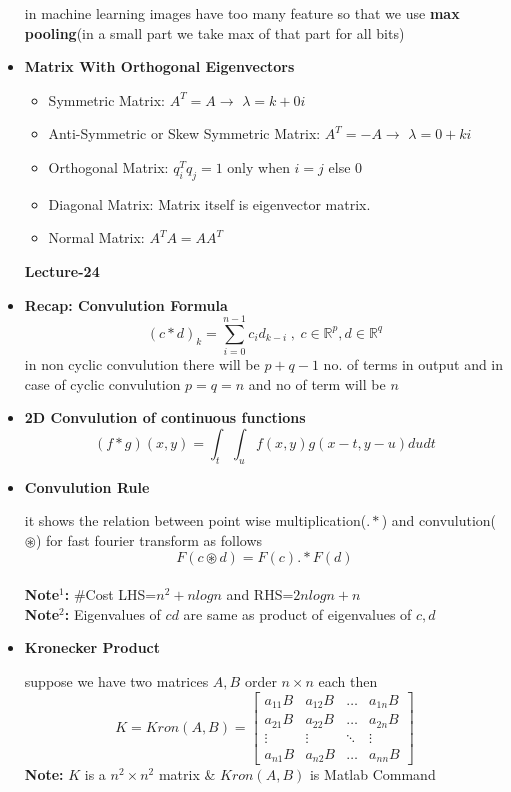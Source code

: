 \documentclass[a4paper]{article}
\numberwithin{equation}{section}
\begin{document}
\begin{itemize}
in machine learning images have too many feature so that we use \textbf{max pooling}(in a small part we take max of that part for all bits)
\item \textbf{Matrix With Orthogonal Eigenvectors}
\begin{itemize}
    \item Symmetric Matrix: $A^T=A \rightarrow$ $\lambda=k+0i$
    \item Anti-Symmetric or Skew Symmetric Matrix: $A^T=-A \rightarrow$ $\lambda=0+ki$
    \item Orthogonal Matrix: $q_i^Tq_j=1$ only when $i=j$ else 0
    \item Diagonal Matrix: Matrix itself is eigenvector matrix.
    \item Normal Matrix: $A^TA=AA^T$
\end{itemize}
\pagebreak
\begin{center}
    \textbf{\Huge{Lecture-24}}
\end{center}
\item \textbf{Recap: Convulution Formula}
\[(c\ast d)_k=\sum_{i=0}^{n-1}c_id_{k-i} \hspace{3pt},\hspace{3pt}c \in \mathbb{R}^p,d\in \mathbb{R}^q\]
in non cyclic convulution there will be $p+q-1$ no. of terms in output and in case of cyclic convulution $p=q=n$ and no of term will be $n$
\item \textbf{2D Convulution of continuous functions}
\[(f\ast g)(x,y)=\int_{t}^{}\int_{u}^{}f(x,y)g(x-t,y-u)dudt\]
\item \textbf{Convulution Rule}

it shows the relation between point wise multiplication($.\ast$) and convulution($\circledast$) for fast fourier transform as follows
\[F(c\circledast d)=F(c).\ast F(d)\]
\\

\textbf{Note$^1$:} \#Cost LHS=$n^2+nlogn$ and RHS=$2nlogn+n$\\
\textbf{Note$^2$:} Eigenvalues of $cd$ are same as product of eigenvalues of $c,d$
\item \textbf{Kronecker Product}

suppose we have two matrices $A,B$ order $n\times n$ each then 
\[K=Kron(A,B)=\begin{bmatrix}
    a_{11}B&a_{12}B&\dots&a_{1n}B\\
    a_{21}B&a_{22}B&\dots&a_{2n}B\\
    \vdots&\vdots&\ddots&\vdots\\
    a_{n1}B&a_{n2}B&\dots&a_{nn}B
\end{bmatrix}\]
\textbf{Note:} $K$ is a $n^2 \times n^2$ matrix \& $Kron(A,B)$ is Matlab Command


\end{itemize}
\end{document}
